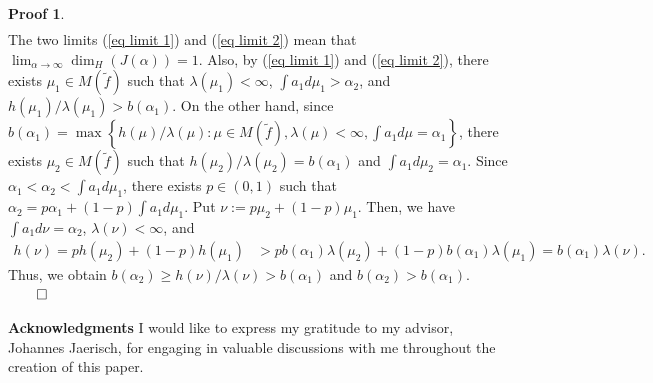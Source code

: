 \documentclass{article}
\theoremstyle{definition}
\newtheorem*{pf}{Proof}
\begin{document}
\begin{pf}
\begin{align}
\end{align}
The two limits (\ref{eq limit 1}) and (\ref{eq limit 2}) mean that $\lim_{\alpha\to\infty}\dim_H(J(\alpha))=1$. 
Also, by (\ref{eq limit 1}) and (\ref{eq limit 2}), there exists $\mu_1 \in M(\tilde f)$ such that $\lambda(\mu_1)<\infty$, $\int a_1 d \mu_1 > \alpha_2$, and ${h(\mu_1)}/{\lambda(\mu_1)}>b(\alpha_1)$. On the other hand, since $b(\alpha_1)=\max \left\{ {h(\mu)}/{\lambda(\mu)}: \mu \in  M(\tilde f), \lambda(\mu)<\infty ,\int a_1 d\mu=\alpha_1 \right\}$, there exists $\mu_2 \in M(\tilde f)$ such that ${h(\mu_2)}/{\lambda(\mu_2)}=b(\alpha_1)$ and $\int a_1 d\mu_2=\alpha_1$. Since $\alpha_1<\alpha_2<\int a_1 d\mu_1$, there exists $p\in(0,1)$ such that $\alpha_2 =p\alpha_1 +(1-p)\int a_1 d\mu_1$. Put $\nu:=p\mu_2+(1-p)\mu_1$. Then, we have $\int a_1 d\nu=\alpha_2$, $\lambda(\nu)<\infty$, and 
\begin{align}
{h(\nu)}=ph(\mu_2)+(1-p)h(\mu_1)\nonumber
&>pb(\alpha_1)\lambda(\mu_2)+(1-p)b(\alpha_1)\lambda(\mu_1) \nonumber
= b(\alpha_1)\lambda(\nu). \nonumber
\end{align}
Thus, we obtain $b(\alpha_2)\geq {h(\nu)}/{\lambda(\nu)}>b(\alpha_1)$ 
and $b(\alpha_2)> b(\alpha_1).$ $\qed$
\end{pf}

\textbf{Acknowledgments}
I would like to express my gratitude to my 
advisor, Johannes Jaerisch, for engaging in valuable discussions with me throughout the creation of this paper.
 

 \nocite{*}
\end{document}

